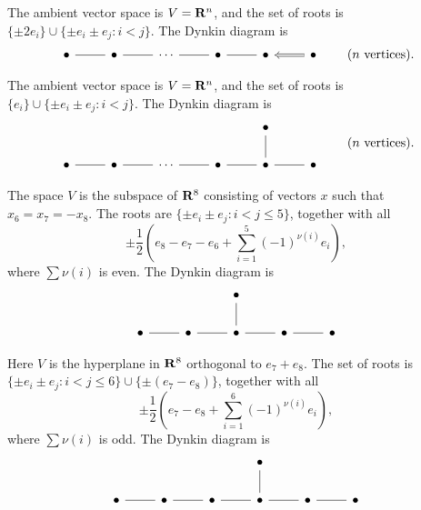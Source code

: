 \begin{example}\label{eg:typeC}
The ambient vector space is $V=\mathbf{R}^n$, and the set of roots is 
$\{\pm 2e_i\}\cup \{\pm e_i\pm e_j:i<j\}$. The Dynkin diagram is 
\[
\begin{tikzcd}
  \bullet \ar[r, dash] 
    & \bullet \ar[r, dash] 
    & \cdots \ar[r, dash] 
    & \bullet \ar[r, dash] 
    & \bullet \ar[r, Leftarrow] 
    & \bullet 
\end{tikzcd}
\qquad\text{($n$ vertices)} .
\]
\end{example}

\begin{example}\label{eg:typeD}
The ambient vector space is $V=\mathbf{R}^n$, and the set of roots is 
$\{e_i\}\cup \{\pm e_i\pm e_j:i<j\}$. The Dynkin diagram is 
\[
\begin{tikzcd}
  & & & & \bullet \\
  \bullet \ar[r, dash]
    & \bullet \ar[r, dash] 
    & \cdots \ar[r, dash]
    & \bullet \ar[r, dash]
    & \bullet \ar[r, dash] \ar[u, dash] 
    & \bullet
\end{tikzcd}
\qquad\text{($n$ vertices)} .
\]
\end{example}

\begin{example}
The space $V$ is the subspace of $\mathbf{R}^8$ consisting of vectors $x$ such that 
$x_6=x_7=-x_8$. The roots are $\{\pm e_i\pm e_j:i<j\leqslant 5\}$, together 
with all 
\[
  \pm \frac 1 2\left(e_8-e_7-e_6 + \sum_{i=1}^5 (-1)^{\nu(i)} e_i\right) ,
\]
where $\sum \nu(i)$ is even. The Dynkin diagram is 
\[\begin{tikzcd}
  & & \bullet \\
  \bullet \ar[r, dash] 
    & \bullet \ar[r, dash]
    & \bullet \ar[r, dash] \ar[u, dash]
    & \bullet \ar[r, dash] 
    & \bullet 
\end{tikzcd}\]
\end{example}

\begin{example}
Here $V$ is the hyperplane in $\mathbf{R}^8$ orthogonal to $e_7+e_8$. The set of 
roots is $\{\pm e_i\pm e_j:i<j\leqslant 6\}\cup\{\pm (e_7-e_8)\}$, together 
with all 
\[
  \pm \frac 1 2\left(e_7-e_8+\sum_{i=1}^6 (-1)^{\nu(i)} e_i\right) ,
\]
where $\sum \nu(i)$ is odd. The Dynkin diagram is 
\[\begin{tikzcd}
  & & & \bullet \\
  \bullet \ar[r, dash] 
    & \bullet \ar[r, dash]
    & \bullet \ar[r, dash]
    & \bullet \ar[r, dash] \ar[u, dash]
    & \bullet \ar[r, dash] 
    & \bullet 
\end{tikzcd}\]
\end{example}

